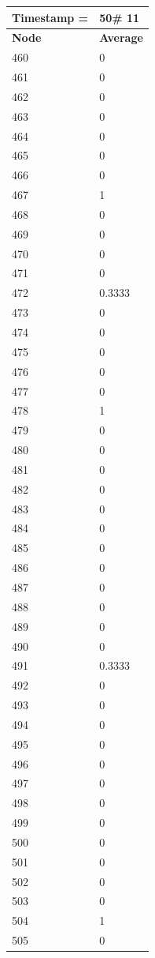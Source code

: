 \begin{tabular}{|l||l|}
\hline
\textbf{Timestamp =} & \textbf{50}\# 11\\\hline
	\textbf{Node} & \textbf{Average} \\ \hline
\hline
	460 & 0 \\ \hline
	461 & 0 \\ \hline
	462 & 0 \\ \hline
	463 & 0 \\ \hline
	464 & 0 \\ \hline
	465 & 0 \\ \hline
	466 & 0 \\ \hline
	467 & 1 \\ \hline
	468 & 0 \\ \hline
	469 & 0 \\ \hline
	470 & 0 \\ \hline
	471 & 0 \\ \hline
	472 & 0.3333 \\ \hline
	473 & 0 \\ \hline
	474 & 0 \\ \hline
	475 & 0 \\ \hline
	476 & 0 \\ \hline
	477 & 0 \\ \hline
	478 & 1 \\ \hline
	479 & 0 \\ \hline
	480 & 0 \\ \hline
	481 & 0 \\ \hline
	482 & 0 \\ \hline
	483 & 0 \\ \hline
	484 & 0 \\ \hline
	485 & 0 \\ \hline
	486 & 0 \\ \hline
	487 & 0 \\ \hline
	488 & 0 \\ \hline
	489 & 0 \\ \hline
	490 & 0 \\ \hline
	491 & 0.3333 \\ \hline
	492 & 0 \\ \hline
	493 & 0 \\ \hline
	494 & 0 \\ \hline
	495 & 0 \\ \hline
	496 & 0 \\ \hline
	497 & 0 \\ \hline
	498 & 0 \\ \hline
	499 & 0 \\ \hline
	500 & 0 \\ \hline
	501 & 0 \\ \hline
	502 & 0 \\ \hline
	503 & 0 \\ \hline
	504 & 1 \\ \hline
	505 & 0 \\ \hline
\end{tabular}
